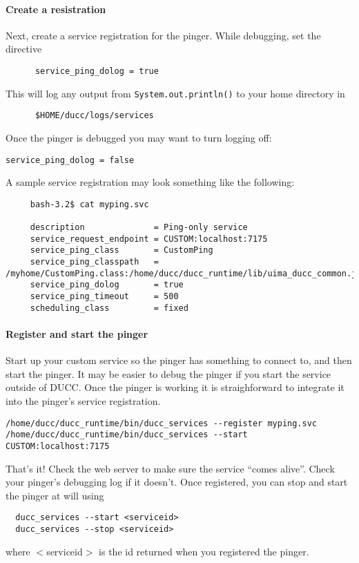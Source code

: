       \paragraph{Create a resistration}Next, create a service registration for the pinger.  While
      debugging, set the directive
\begin{verbatim}
      service_ping_dolog = true
\end{verbatim}
      This will log any output from  {\tt System.out.println()} to your home directory in
\begin{verbatim}
      $HOME/ducc/logs/services
\end{verbatim}

      Once the pinger is debugged you may want to turn logging off:
\begin{verbatim}
service_ping_dolog = false
\end{verbatim}
      
      A sample service registration may look something like the following:
\begin{verbatim}
     bash-3.2$ cat myping.svc

     description              = Ping-only service
     service_request_endpoint = CUSTOM:localhost:7175
     service_ping_class       = CustomPing
     service_ping_classpath   = /myhome/CustomPing.class:/home/ducc/ducc_runtime/lib/uima_ducc_common.jar
     service_ping_dolog       = true
     service_ping_timeout     = 500
     scheduling_class         = fixed
\end{verbatim}
       
      \paragraph{Register and start the pinger} Start up your custom service so the pinger has something to connect to, and then start
      the pinger.  It may be easier to debug the pinger if you start the service outside of DUCC. Once
      the pinger is working it is straighforward to integrate it into the pinger's service registration.
\begin{verbatim}
/home/ducc/ducc_runtime/bin/ducc_services --register myping.svc
/home/ducc/ducc_runtime/bin/ducc_services --start CUSTOM:localhost:7175
\end{verbatim}

      That's it!  Check the web server to make sure the service ``comes alive''.  Check your pinger's
      debugging log if it doesn't.  Once registered, you can stop and start the pinger at will using
\begin{verbatim}
  ducc_services --start <serviceid>
  ducc_services --stop <serviceid>
\end{verbatim}
     where $<$serviceid$>$ is the id returned when you registered the pinger.
